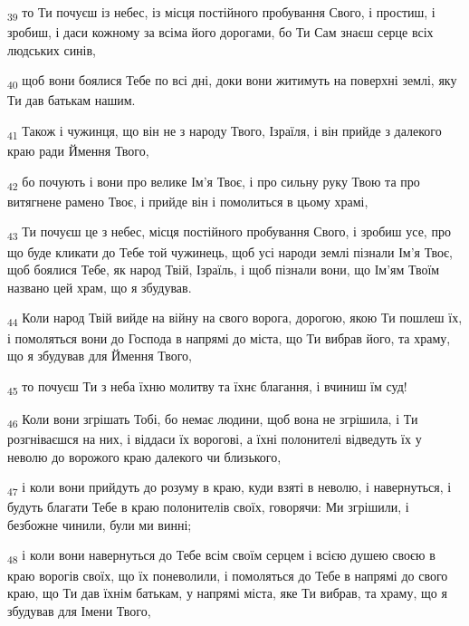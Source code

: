 \begin{tcolorbox}
\textsubscript{39} то Ти почуєш із небес, із місця постійного пробування Свого, і простиш, і зробиш, і даси кожному за всіма його дорогами, бо Ти Сам знаєш серце всіх людських синів,
\end{tcolorbox}
\begin{tcolorbox}
\textsubscript{40} щоб вони боялися Тебе по всі дні, доки вони житимуть на поверхні землі, яку Ти дав батькам нашим.
\end{tcolorbox}
\begin{tcolorbox}
\textsubscript{41} Також і чужинця, що він не з народу Твого, Ізраїля, і він прийде з далекого краю ради Ймення Твого,
\end{tcolorbox}
\begin{tcolorbox}
\textsubscript{42} бо почують і вони про велике Ім'я Твоє, і про сильну руку Твою та про витягнене рамено Твоє, і прийде він і помолиться в цьому храмі,
\end{tcolorbox}
\begin{tcolorbox}
\textsubscript{43} Ти почуєш це з небес, місця постійного пробування Свого, і зробиш усе, про що буде кликати до Тебе той чужинець, щоб усі народи землі пізнали Ім'я Твоє, щоб боялися Тебе, як народ Твій, Ізраїль, і щоб пізнали вони, що Ім'ям Твоїм названо цей храм, що я збудував.
\end{tcolorbox}
\begin{tcolorbox}
\textsubscript{44} Коли народ Твій вийде на війну на свого ворога, дорогою, якою Ти пошлеш їх, і помоляться вони до Господа в напрямі до міста, що Ти вибрав його, та храму, що я збудував для Ймення Твого,
\end{tcolorbox}
\begin{tcolorbox}
\textsubscript{45} то почуєш Ти з неба їхню молитву та їхнє благання, і вчиниш їм суд!
\end{tcolorbox}
\begin{tcolorbox}
\textsubscript{46} Коли вони згрішать Тобі, бо немає людини, щоб вона не згрішила, і Ти розгніваєшся на них, і віддаси їх ворогові, а їхні полонителі відведуть їх у неволю до ворожого краю далекого чи близького,
\end{tcolorbox}
\begin{tcolorbox}
\textsubscript{47} і коли вони прийдуть до розуму в краю, куди взяті в неволю, і навернуться, і будуть благати Тебе в краю полонителів своїх, говорячи: Ми згрішили, і безбожне чинили, були ми винні;
\end{tcolorbox}
\begin{tcolorbox}
\textsubscript{48} і коли вони навернуться до Тебе всім своїм серцем і всією душею своєю в краю ворогів своїх, що їх поневолили, і помоляться до Тебе в напрямі до свого краю, що Ти дав їхнім батькам, у напрямі міста, яке Ти вибрав, та храму, що я збудував для Імени Твого,
\end{tcolorbox}

